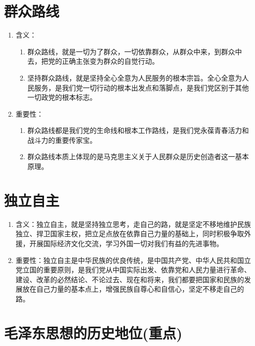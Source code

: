 \documentclass[12pt, a4paper, oneside]{ctexbook}
\begin{document}
\section{群众路线}

\begin{enumerate}
\item 含义：
\begin{enumerate}[label=(\arabic*)]
\item 群众路线，就是一切为了群众，一切依靠群众，从群众中来，到群众中去，把党的正确主张变为群众的自觉行动。

\item 坚持群众路线，就是坚持全心全意为人民服务的根本宗旨。全心全意为人民服务，是我们党一切行动的根本出发点和落脚点，是我们党区别于其他一切政党的根本标志。
\end{enumerate}

\item 重要性：
\begin{enumerate}[label=(\arabic*)]
\item 群众路线都是我们党的生命线和根本工作路线，是我们党永葆青春活力和战斗力的重要传家宝。

\item 群众路线本质上体现的是马克思主义关于人民群众是历史创造者这一基本原理。
\end{enumerate}
\end{enumerate}

\section{独立自主}

\begin{enumerate}
\item 含义：独立自主，就是坚持独立思考，走自己的路，就是坚定不移地维护民族独立、捍卫国家主权，把立足点放在依靠自己力量的基础上，同时积极争取外援，开展国际经济文化交流，学习外国一切对我们有益的先进事物。

\item 重要性：独立自主是中华民族的优良传统，是中国共产党、中华人民共和国立党立国的重要原则，是我们党从中国实际出发、依靠党和人民力量进行革命、建设、改革的必然结论、不论过去、现在和将来，我们都要把国家和民族的发展放在自己力量的基本点上，增强民族自尊心和自信心，坚定不移走自己的路。
\end{enumerate}

\section{毛泽东思想的历史地位(重点)}
\end{document}
